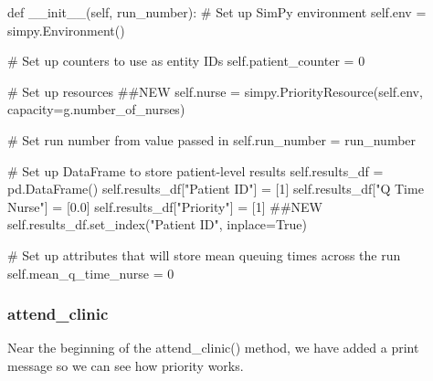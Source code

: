 \documentclass[
  letterpaper,
  DIV=11,
  numbers=noendperiod]{scrreprt}
\newenvironment{Shaded}{\begin{snugshade}}{\end{snugshade}}
\newcommand{\CommentTok}[1]{\textcolor[rgb]{0.37,0.37,0.37}{#1}}
\newcommand{\DecValTok}[1]{\textcolor[rgb]{0.68,0.00,0.00}{#1}}
\newcommand{\FloatTok}[1]{\textcolor[rgb]{0.68,0.00,0.00}{#1}}
\newcommand{\FunctionTok}[1]{\textcolor[rgb]{0.28,0.35,0.67}{#1}}
\newcommand{\KeywordTok}[1]{\textcolor[rgb]{0.00,0.23,0.31}{#1}}
\newcommand{\NormalTok}[1]{\textcolor[rgb]{0.00,0.23,0.31}{#1}}
\newcommand{\OperatorTok}[1]{\textcolor[rgb]{0.37,0.37,0.37}{#1}}
\newcommand{\StringTok}[1]{\textcolor[rgb]{0.13,0.47,0.30}{#1}}
\newcommand{\VariableTok}[1]{\textcolor[rgb]{0.07,0.07,0.07}{#1}}
\begin{document}
\begin{Shaded}
\begin{Highlighting}[]
\KeywordTok{def} \FunctionTok{\_\_init\_\_}\NormalTok{(}\VariableTok{self}\NormalTok{, run\_number):}
        \CommentTok{\# Set up SimPy environment}
        \VariableTok{self}\NormalTok{.env }\OperatorTok{=}\NormalTok{ simpy.Environment()}

        \CommentTok{\# Set up counters to use as entity IDs}
        \VariableTok{self}\NormalTok{.patient\_counter }\OperatorTok{=} \DecValTok{0}

        \CommentTok{\# Set up resources}
        \CommentTok{\#\#NEW}
        \VariableTok{self}\NormalTok{.nurse }\OperatorTok{=}\NormalTok{ simpy.PriorityResource(}\VariableTok{self}\NormalTok{.env,}
\NormalTok{                                            capacity}\OperatorTok{=}\NormalTok{g.number\_of\_nurses)}

        \CommentTok{\# Set run number from value passed in}
        \VariableTok{self}\NormalTok{.run\_number }\OperatorTok{=}\NormalTok{ run\_number}


        \CommentTok{\# Set up DataFrame to store patient{-}level results}
        \VariableTok{self}\NormalTok{.results\_df }\OperatorTok{=}\NormalTok{ pd.DataFrame()}
        \VariableTok{self}\NormalTok{.results\_df[}\StringTok{"Patient ID"}\NormalTok{] }\OperatorTok{=}\NormalTok{ [}\DecValTok{1}\NormalTok{]}
        \VariableTok{self}\NormalTok{.results\_df[}\StringTok{"Q Time Nurse"}\NormalTok{] }\OperatorTok{=}\NormalTok{ [}\FloatTok{0.0}\NormalTok{]}
        \VariableTok{self}\NormalTok{.results\_df[}\StringTok{"Priority"}\NormalTok{] }\OperatorTok{=}\NormalTok{ [}\DecValTok{1}\NormalTok{] }\CommentTok{\#\#NEW}
        \VariableTok{self}\NormalTok{.results\_df.set\_index(}\StringTok{"Patient ID"}\NormalTok{, inplace}\OperatorTok{=}\VariableTok{True}\NormalTok{)}

        \CommentTok{\# Set up attributes that will store mean queuing times across the run}
        \VariableTok{self}\NormalTok{.mean\_q\_time\_nurse }\OperatorTok{=} \DecValTok{0}
\end{Highlighting}
\end{Shaded}

\subsubsection{attend\_clinic}\label{attend_clinic}

Near the beginning of the attend\_clinic() method, we have added a print
message so we can see how priority works.
\end{document}
